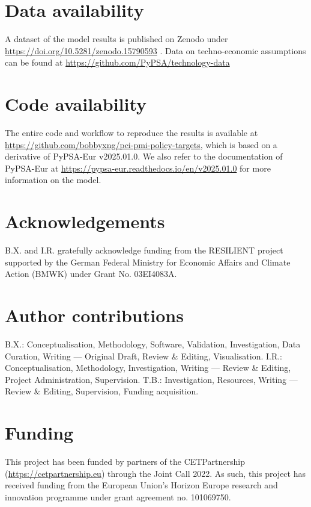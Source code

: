 \documentclass[pdflatex,sn-nature]{sn-jnl}%
\theoremstyle{thmstyleone}%
\theoremstyle{thmstyletwo}%
\theoremstyle{thmstylethree}%
\begin{document}
\backmatter

\section*{Data availability}
A dataset of the model results is published on Zenodo under \href{https://doi.org/10.5281/zenodo.15790593}{https://doi.org/10.5281/zenodo.15790593} \cite{xiongResultDataRole2025}. Data on techno-economic assumptions can be found at \href{https://github.com/PyPSA/technology-data}{https://github.com/PyPSA/technology-data}

\section*{Code availability}
The entire code and workflow to reproduce the results is available at \href{https://github.com/bobbyxng/pci-pmi-policy-targets}{https://github.com/bobbyxng/pci-pmi-policy-targets}, which is based on a derivative of PyPSA-Eur v2025.01.0. We also refer to the documentation of PyPSA-Eur at \href{https://pypsa-eur.readthedocs.io/en/v2025.01.0}{https://pypsa-eur.readthedocs.io/en/v2025.01.0} for more information on the model.

\section*{Acknowledgements}
B.X. and I.R. gratefully acknowledge funding from the RESILIENT project supported by the German Federal Ministry for Economic Affairs and Climate Action (BMWK) under Grant No. 03EI4083A. 

\section*{Author contributions}
B.X.: Conceptualisation, Methodology, Software, Validation, Investigation, Data Curation, Writing --- Original Draft, Review \& Editing, Visualisation. I.R.: Conceptualisation, Methodology, Investigation, Writing --- Review \& Editing, Project Administration, Supervision. T.B.: Investigation, Resources, Writing --- Review \& Editing, Supervision, Funding acquisition.

\section*{Funding}
This project has been funded by partners of the CETPartnership (\href{https://cetpartnership.eu}{https://cetpartnership.eu}) through the Joint Call 2022. As such, this project has received funding from the European Union's Horizon Europe research and innovation programme under grant agreement no. 101069750.
\end{document}
